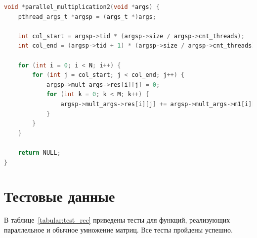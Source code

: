 \documentclass[12pt]{report}
\begin{document}
\begin{lstlisting}[label=some-code,caption=Функция умножения матриц параллельно. Способ №2,language=C]
void *parallel_multiplication2(void *args) {
	pthread_args_t *argsp = (args_t *)args;

	int col_start = argsp->tid * (argsp->size / argsp->cnt_threads);
	int col_end = (argsp->tid + 1) * (argsp->size / argsp->cnt_threads);

	for (int i = 0; i < N; i++) {
		for (int j = col_start; j < col_end; j++) {
			argsp->mult_args->res[i][j] = 0;
			for (int k = 0; k < M; k++) {
				argsp->mult_args->res[i][j] += argsp->mult_args->m1[i][k] * argsp->mult_args->m2[k][j];
			}
		}
	}

	return NULL;
}

\end{lstlisting}

\section{Тестовые данные}

В таблице~\ref{tabular:test_rec} приведены тесты для функций, реализующих параллельное и обычное умножение матриц. Все тесты пройдены успешно.
\end{document}
